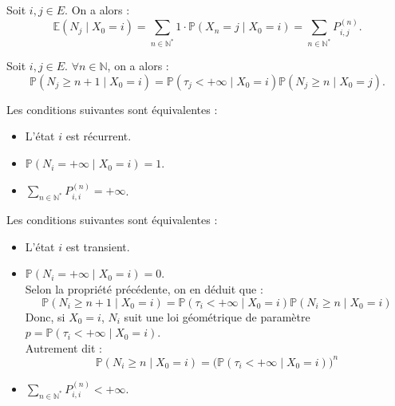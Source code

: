 \documentclass{article}
\begin{document}
\begin{tcolorbox}[colback=white,colframe=yellow!80!black,title=Exemple (Application de $N_i$ à l'espérance)]
Soit $i, j \in E$. On a alors :
\[
\mathbb{E}(N_j \mid X_0 = i) = \sum_{n \in \mathbb{N}^{*}} \text{1} \cdot \mathbb{P}(X_n = j \mid X_0 = i) = \sum_{n \in \mathbb{N}^{*}} P_{i,j}^{(n)}.
\]
\end{tcolorbox}

\begin{tcolorbox}[colback=white,colframe=red!80!black,title=Formule de récurrence conditionnelle (admise)]
Soit $i, j \in E$. $\forall n \in \mathbb{N}$, on a alors :
\[
\mathbb{P}(N_j \geq n+1 \mid X_0 = i) = \mathbb{P}(\tau_j < +\infty \mid X_0 = i)\mathbb{P}(N_j \geq n \mid X_0 = j).
\]
\end{tcolorbox}

\begin{tcolorbox}[colback=white,colframe=blue!80!black,title=Propriétés équivalentes des états récurrents/transients]
Les conditions suivantes sont équivalentes :
\begin{itemize}
    \item L'état $i$ est récurrent.
    \item $\mathbb{P}(N_i = +\infty \mid X_0 = i) = 1$.
    \item $\sum_{n \in \mathbb{N}^{*}} P_{i,i}^{(n)} = +\infty$. \\
\end{itemize}

Les conditions suivantes sont équivalentes :
\begin{itemize}
    \item L'état $i$ est transient.
    \item $\mathbb{P}(N_i = +\infty \mid X_0 = i) = 0$.
    \vspace{1em} \\
        Selon la propriété précédente, on en déduit que :
        \[
        \mathbb{P}(N_i \geq n+1 \mid X_0 = i) = \mathbb{P}(\tau_i < +\infty \mid X_0 = i)\mathbb{P}(N_i \geq n \mid X_0 = i)
        \]
        Donc, si $X_0 = i$, $N_i$ suit une loi géométrique de paramètre $p = \mathbb{P}(\tau_i < +\infty \mid X_0 = i)$. \\
        Autrement dit :
        \[
        \mathbb{P}(N_i \geq n \mid X_0 = i) = \big(\mathbb{P}(\tau_i < +\infty \mid X_0 = i)\big)^{n}
        \]
    \item $\sum_{n \in \mathbb{N}^{*}} P_{i,i}^{(n)} < +\infty$.
\end{itemize}
\end{tcolorbox}
\end{document}
